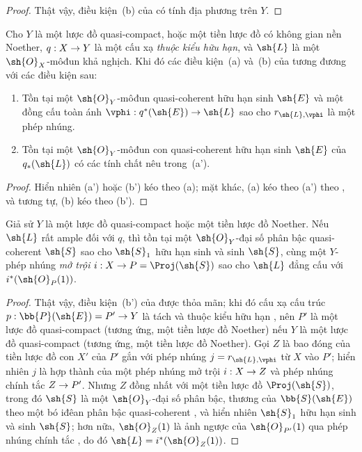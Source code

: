 \documentclass[oneside,10pt]{amsart}
\makeatletter
\newcommand{\ega@arrow}[2]{\mathchoice{#1}{#2}{#2}{#2}}
\renewcommand{\to}{\ega@arrow{\longrightarrow}{\rightarrow}}
\let\EGAOriginalLabel\label
\renewcommand{\label}[1]{\phantomsection\EGAOriginalLabel{#1}}
\makeatother
\begin{document}
\begin{proof}
Thật vậy, điều kiện~(b) của  có tính địa phương trên $Y$.
\end{proof}

\begin{proposition}[4.4.6]
\label{II.4.4.6}
Cho $Y$ là một lược đồ quasi-compact, hoặc một tiền lược đồ có không gian nền Noether, $q:X\to Y$ là một cấu xạ \emph{thuộc kiểu hữu hạn}, và $\sh{L}$ là một $\sh{O}_X$-môđun khả nghịch.
Khi đó các điều kiện~(a) và~(b) của  tương đương với các điều kiện sau:
\begin{enumerate}
  \item[\rm{(a')}] Tồn tại một $\sh{O}_Y$-môđun quasi-coherent hữu hạn sinh $\sh{E}$ và một đồng cấu toàn ánh $\vphi:q^*(\sh{E})\to\sh{L}$ sao cho $r_{\sh{L},\vphi}$ là một phép nhúng.
  \item[\rm{(b')}] Tồn tại một $\sh{O}_Y$-môđun con quasi-coherent hữu hạn sinh $\sh{E}$ của $q_*(\sh{L})$ có các tính chất nêu trong~(a').
\end{enumerate}
\end{proposition}

\begin{proof}
Hiển nhiên (a') hoặc (b') kéo theo (a);
mặt khác, (a) kéo theo (a') theo , và tương tự, (b) kéo theo (b').
\end{proof}

\begin{corollary}[4.4.7]
\label{II.4.4.7}
Giả sử $Y$ là một lược đồ quasi-compact hoặc một tiền lược đồ Noether.
Nếu $\sh{L}$ rất ample đối với $q$, thì tồn tại một $\sh{O}_Y$-đại số phân bậc quasi-coherent $\sh{S}$ sao cho $\sh{S}_1$ hữu hạn sinh và sinh $\sh{S}$, cùng một $Y$-phép nhúng \emph{mở trội} $i:X\to P=\Proj(\sh{S})$ sao cho $\sh{L}$ đẳng cấu với $i^*(\sh{O}_P(1))$.
\end{corollary}

\begin{proof}
Thật vậy, điều kiện~(b') của  được thỏa mãn;
khi đó cấu xạ cấu trúc $p:\bb{P}(\sh{E})=P'\to Y$ là tách và thuộc kiểu hữu hạn , nên $P'$ là một lược đồ quasi-compact (tương ứng, một tiền lược đồ Noether) nếu $Y$ là một lược đồ quasi-compact (tương ứng, một tiền lược đồ Noether).
Gọi $Z$ là bao đóng  của tiền lược đồ con $X'$ của $P'$ gắn với phép nhúng $j=r_{\sh{L},\vphi}$ từ $X$ vào $P'$;
hiển nhiên $j$ là hợp thành của một phép nhúng mở trội $i:X\to Z$ và phép nhúng chính tắc $Z\to P'$.
Nhưng $Z$ đồng nhất với một tiền lược đồ $\Proj(\sh{S})$, trong đó $\sh{S}$ là một $\sh{O}_Y$-đại số phân bậc, thương của $\bb{S}(\sh{E})$ theo một bó iđêan phân bậc quasi-coherent , và hiển nhiên $\sh{S}_1$ hữu hạn sinh và sinh $\sh{S}$;
hơn nữa, $\sh{O}_Z(1)$ là ảnh ngược của $\sh{O}_{P'}(1)$ qua phép nhúng chính tắc , do đó $\sh{L}=i^*(\sh{O}_Z(1))$.
\end{proof}
\end{document}
